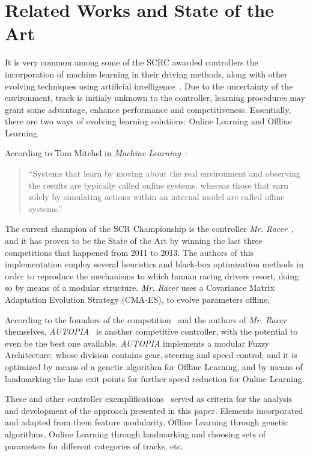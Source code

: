 \section{\textbf{Related Works and State of the Art}} \label{sec:Related}
	
	It is very common among some of the SCRC awarded controllers the incorporation of machine learning in their driving methods, along with other evolving techniques using artificial intelligence~\cite{2009}. Due to the uncertainty of the environment, track is initialy unknown to the controller, learning procedures may grant some advantage, enhance performance and competitiveness. Essentially, there are two ways of evolving learning solutions: Online Learning and Offline Learning.

	According to Tom Mitchel in \emph{Machine Learning}~\cite{Mitcchel:ML}:

	\begin{quotation} \itshape

		``Systems that learn by moving about the real environment and observing the results are typically called online systems, whereas those that earn solely by simulating actions within an internal model are called ofline systems.''
	
	\end{quotation}

	The current champion of the SCR Championship is the controller \emph{Mr. Racer}~\cite{MrRacer}, and it has proven to be the State of the Art by winning the last three competitions that happened from 2011 to 2013. The authors of this implementation employ several heuristics and black-box optimization methods in order to reproduce the mechanisms to which human racing drivers resort, doing so by means of a modular structure. \emph{Mr. Racer} uses a Covariance Matrix Adaptation Evolution Strategy (CMA-ES), to evolve parameters offline.
	
	According to the founders of the competition~\cite{SCRC} and the authors of \emph{Mr. Racer} themselves, \emph{AUTOPIA}~\cite{AUTOPIA} is another competitive controller, with the potential to even be the best one available. \emph{AUTOPIA} implements a modular Fuzzy Architecture, whose division contains gear, steering and speed control; and it is optimized by means of a genetic algorithm for Offline Learning, and by means of landmarking the lane exit points for further speed reduction for Online Learning.
	
	These and other controller exemplifications~\cite{SCRC} served as criteria for the analysis and development of the approach presented in this paper. Elements incorporated and adapted from them feature modularity, Offline Learning through genetic algorithms, Online Learning through landmarking and choosing sets of parameters for different categories of tracks, etc.
	
